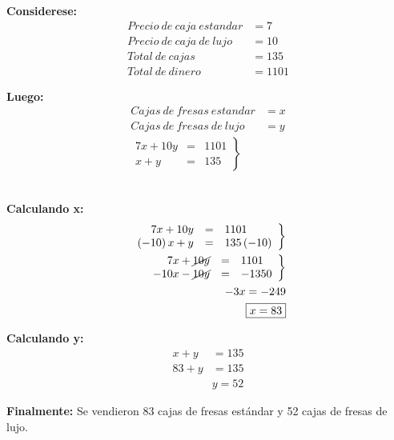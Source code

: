 \documentclass[11pt, a4paper]{article}
\begin{document}
\begin{multicols}{2}
  \textbf{Considerese:}
  \begin{align*}
  Precio\ de\ caja\ estandar &= 7\\
  Precio\ de\ caja\ de\ lujo &= 10\\
  Total\ de\ cajas &= 135\\
  Total\ de\ dinero &= 1101
  \end{align*}

  \textbf{Luego:}
  \begin{align*}
    Cajas\ de\ fresas\ estandar &= x \\
    Cajas\ de\ fresas\ de\ lujo &= y\\
    \left.
      \begin{array}{rcl}
        7x + 10y &= &1101\\
        x + y &= &135
        \end{array}
    \right\}
  \end{align*}\\

  \columnseprule=1pt 
  \columnbreak

  \textbf{Calculando x:}
  \begin{align*}
    \left.
      \begin{array}{rcl}
        7x + 10y &= &1101\\
        \left(-10\right)x + y &= &135\left(-10\right)
        \end{array}
    \right\}\\
    \left.
      \begin{array}{rcl}
        7x + \cancel{10y} &= &1101\\
        -10x -\cancel{10y} &= &-1350
        \end{array}
    \right\}\\
    -3x = -249\\
    \boxed{x = 83}
  \end{align*}


  \textbf{Calculando y:}
  \begin{align*}
    x + y &= 135\\
    83 + y &= 135\\
    &\boxed{y = 52}
  \end{align*}
\end{multicols}
\textbf{Finalmente:}
Se vendieron 83 cajas de fresas estándar y 52 cajas de fresas de lujo.
\end{document}
